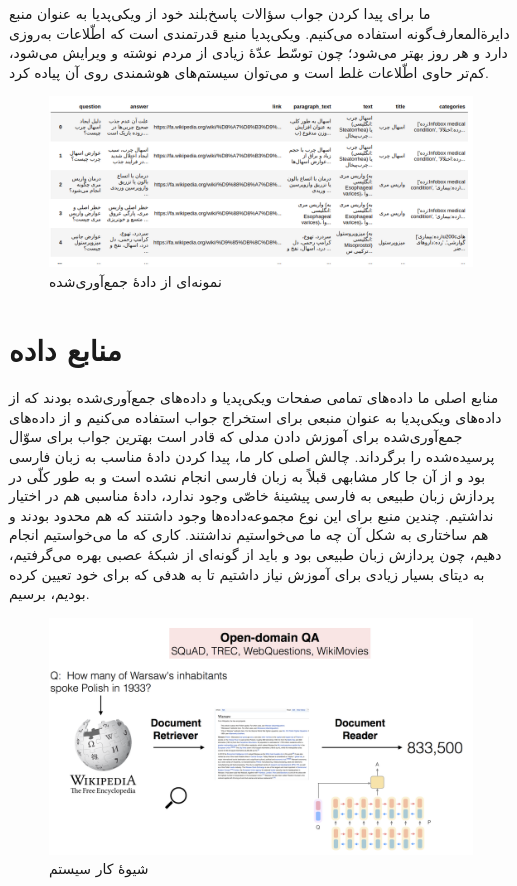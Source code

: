 \documentclass{CCI2020}
\begin{document}
ما برای پیدا کردن جواب سؤالات پاسخ‌بلند خود از ویکی‌پدیا به عنوان منبع دایرة‌المعارف‌گونه استفاده می‌کنیم. ویکی‌پدیا منبع قدرتمندی است که اطّلاعات به‌روزی دارد و هر روز بهتر می‌شود؛ چون توسّط عدّهٔ زیادی از مردم نوشته و ویرایش می‌شود، کم‌تر حاوی اطّلاعات غلط است و می‌توان سیستم‌های هوشمندی روی آن پیاده کرد.



\begin{figure}[!htp]
    \centering
    \includegraphics[width=15cm]{images/data.png}
    \caption{نمونه‌ای از دادهٔ جمع‌آوری‌شده}
    \label{fig:galaxy}
\end{figure}


\section{منابع داده}
منابع اصلی ما داده‌های تمامی صفحات ویکی‌پدیا و داده‌های جمع‌آوری‌شده بودند که از داده‌های ویکی‌پدیا به عنوان منبعی برای استخراج جواب استفاده می‌کنیم و از داده‌های جمع‌آوری‌شده برای آموزش دادن مدلی که قادر است بهترین جواب برای سوّال پرسیده‌شده را برگرداند.
چالش اصلی کار ما، پیدا کردن دادهٔ مناسب به زبان فارسی بود و از آن جا کار مشابهی قبلاً به زبان فارسی انجام نشده است و به طور کلّی در پردازش زبان طبیعی به فارسی پیشینهٔ خاصّی وجود ندارد، دادهٔ مناسبی هم در اختیار نداشتیم. چندین منبع برای این نوع مجموعه‌داده‌ها وجود داشتند که هم محدود بودند و هم ساختاری به شکل آن چه ما می‌خواستیم نداشتند. کاری که ما می‌خواستیم انجام دهیم، چون پردازش زبان طبیعی بود و باید از گونه‌ای از شبکهٔ عصبی بهره می‌گرفتیم، به دیتای بسیار زیادی برای آموزش نیاز داشتیم تا به هدفی که برای خود تعیین کرده بودیم، برسیم.

\begin{figure}[!htp]
    \centering
    \includegraphics[width=15cm]{images/drqa.png}
    \caption{شیوهٔ کار سیستم }
    \label{fig:galaxy}
\end{figure}
\end{document}
